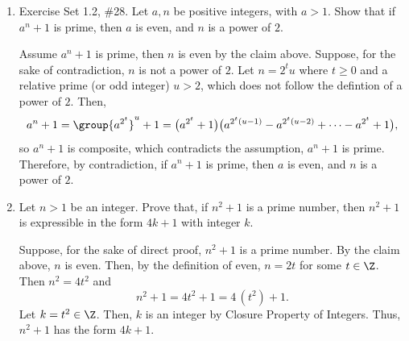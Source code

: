 \begin{enumerate}
  \begin{claim}
  Let $n > 1$ be an integer. If $n^{2}+1$ is prime then $n$ is even.
    \begin{subprove}
    Assume $n^{2}+1$ is prime. Suppose, for the sake of contradiction, $n$ is 
    odd. Then, $n=2k+1$ for some $k\in\mathbb{Z}$. That is,
    \[
    n^{2}+1=(2k+1)^{2}+1=4k^{2}+4k+2=2\bigl(2k^{2}+2k+1\bigr).
    \]
    Thus, $n^{2}+1$ is even where $n^{2}+1 \ge 5$ by the assumption, not a prime. Therefore, by contradiction, If $n^{2}+1$ is prime then $n$ is even.
    \end{subprove}
  \end{claim}

  \item Exercise Set 1.2, \#28. Let $a,n$ be positive integers, with $a > 1$. Show that 
  if $a^{n}+1$ is prime, then $a$ is even, and $n$ is a power of $2$.
  \begin{subprove}
    Assume $a^{n}+1$ is prime, then $n$ is even by the claim above. Suppose, for 
    the sake of contradiction, $n$ is not a power of $2$. 
    Let $n=2^{t}u$ where $t\ge 0$ and a relative prime (or odd integer) $u>2$, 
    which does not follow the defintion of a power of $2$. Then,
    \[
    a^{n}+1 = \group{a^{2^{t}}}^u+1
    = \bigl(a^{2^{t}}+1\bigr)\bigl(a^{2^{t}(u-1)}-a^{2^{t}(u-2)}+\cdots - a^{2^{t}}+1\bigr),
    \]
    so $a^{n}+1$ is composite, which contradicts the assumption, $a^{n}+1$ is prime. 
    Therefore, by contradiction, if $a^{n}+1$ is prime, then $a$ is even, and $n$ is a power of $2$.
  \end{subprove}

  \item Let $n > 1$ be an integer. Prove that, if $n^{2} + 1$ is a prime number, then 
  $n^{2} + 1$ is expressible in the form $4k + 1$ with integer $k$.
  \begin{subprove}
    Suppose, for the sake of direct proof, $n^{2} + 1$ is a prime number. By the claim above, $n$ is even. 
    Then, by the definition of even, $n=2t$ for some $t\in\Z$. Then $n^{2}=4t^{2}$ and
    \[
      n^{2}+1 = 4t^{2}+1 = 4\,(t^{2}) + 1.
    \]
    Let $k=t^{2}\in\Z$. Then, $k$ is an integer by Closure Property of Integers. Thus, 
    $n^{2}+1$ has the form $4k+1$.
  \end{subprove}





  \newpage







\end{enumerate}
